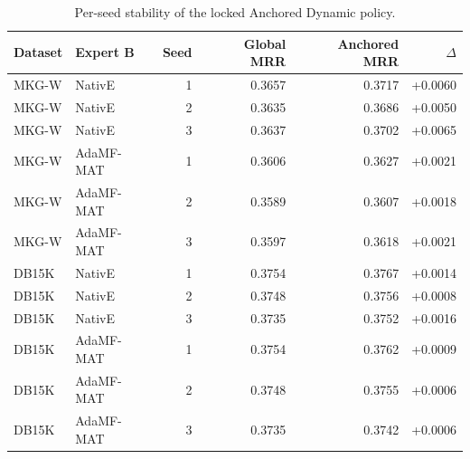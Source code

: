 \begin{table}[t]
\centering
\small
\caption{Per-seed stability of the locked Anchored Dynamic policy.}
\label{tab:supp_anchored_dynamic_by_seed}
\setlength{\tabcolsep}{4pt}
\begin{tabular}{llrrrr}
\toprule
Dataset & Expert B & Seed & Global MRR & Anchored MRR & $\Delta$ \\
\midrule
MKG-W & NativE & 1 & 0.3657 & 0.3717 & +0.0060 \\
MKG-W & NativE & 2 & 0.3635 & 0.3686 & +0.0050 \\
MKG-W & NativE & 3 & 0.3637 & 0.3702 & +0.0065 \\
\addlinespace
MKG-W & AdaMF-MAT & 1 & 0.3606 & 0.3627 & +0.0021 \\
MKG-W & AdaMF-MAT & 2 & 0.3589 & 0.3607 & +0.0018 \\
MKG-W & AdaMF-MAT & 3 & 0.3597 & 0.3618 & +0.0021 \\
\addlinespace
DB15K & NativE & 1 & 0.3754 & 0.3767 & +0.0014 \\
DB15K & NativE & 2 & 0.3748 & 0.3756 & +0.0008 \\
DB15K & NativE & 3 & 0.3735 & 0.3752 & +0.0016 \\
\addlinespace
DB15K & AdaMF-MAT & 1 & 0.3754 & 0.3762 & +0.0009 \\
DB15K & AdaMF-MAT & 2 & 0.3748 & 0.3755 & +0.0006 \\
DB15K & AdaMF-MAT & 3 & 0.3735 & 0.3742 & +0.0006 \\
\bottomrule
\end{tabular}
\end{table}
